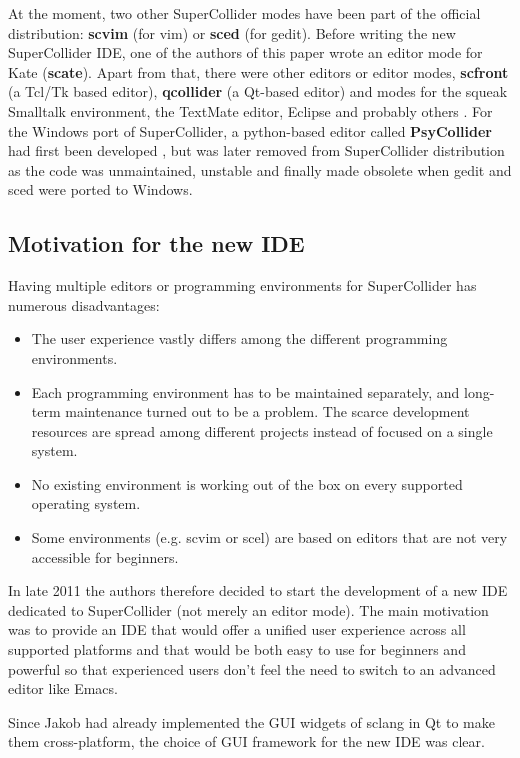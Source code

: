 \documentclass[11pt,a4paper]{article}
\begin{document}
At the moment, two other SuperCollider modes have been part of the official distribution: \textbf{scvim} (for vim) or
\textbf{sced} (for gedit). Before writing the new SuperCollider IDE, one of the authors of this paper
wrote an editor mode for Kate (\textbf{scate}). Apart from that, there were other editors or editor modes,
\textbf{scfront} (a Tcl/Tk based editor), \textbf{qcollider} (a Qt-based editor) and modes for the squeak Smalltalk
environment, the TextMate editor, Eclipse and probably others \cite{collision}. For the Windows port of SuperCollider, a
python-based editor called \textbf{PsyCollider} had first been developed \cite{dos}, but was later removed from
SuperCollider distribution as the code was unmaintained, unstable and finally made obsolete when gedit and sced were
ported to Windows.

\subsection{Motivation for the new IDE}

Having multiple editors or programming environments for SuperCollider has numerous disadvantages:

\begin{itemize}
\item The user experience vastly differs among the different programming environments.
\item Each programming environment has to be maintained separately, and long-term maintenance turned out to be a
  problem. The scarce development resources are spread among different projects instead of focused on a single system.
\item No existing environment is working out of the box on every supported operating system.
\item Some environments (e.g. scvim or scel) are based on editors that are not very accessible for beginners.
\end{itemize}

In late 2011 the authors therefore decided to start the development of a new IDE dedicated to SuperCollider (not
merely an editor mode). The main motivation was to provide an IDE that would offer a unified user experience across all
supported platforms and that would be both easy to use for beginners and powerful so that experienced users don't feel the
need to switch to an advanced editor like Emacs.

Since Jakob had already implemented the GUI widgets of sclang in Qt to make them cross-platform, the choice of GUI
framework for the new IDE was clear.
\end{document}
